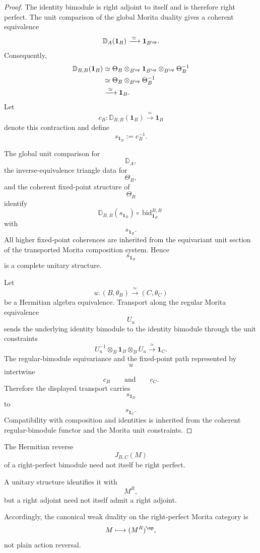 \begin{proof}
The identity bimodule is right adjoint to itself and is therefore right
perfect. The unit comparison of the global Morita duality gives a
coherent equivalence
\[
    \mathbb D_A(\mathbf 1_B)
    \xrightarrow{\;\simeq\;}
    \mathbf 1_{B^{\op}}.
\]
Consequently,
\[
\begin{aligned}
    \mathbb D_{B,B}(\mathbf 1_B)
    &\simeq
    \Theta_B
    \otimes_{B^{\op}}
    \mathbf 1_{B^{\op}}
    \otimes_{B^{\op}}
    \Theta_B^{-1}
    \\
    &\simeq
    \Theta_B
    \otimes_{B^{\op}}
    \Theta_B^{-1}
    \\
    &\xrightarrow{\;\simeq\;}
    \mathbf 1_B.
\end{aligned}
\]
Let
\[
    c_B
    \colon
    \mathbb D_{B,B}(\mathbf 1_B)
    \xrightarrow{\;\simeq\;}
    \mathbf 1_B
\]
denote this contraction and define
\[
    s_{\mathbf 1_B}
    :=
    c_B^{-1}.
\]

The global unit comparison for
\[
    \mathbb D_A,
\]
the inverse-equivalence triangle data for
\[
    \Theta_B,
\]
and the coherent fixed-point structure of
\[
    \Theta_B
\]
identify
\[
    \mathbb D_{B,B}(s_{\mathbf 1_B})
    \circ
    \operatorname{bid}^{B,B}_{\mathbf 1_B}
\]
with
\[
    s_{\mathbf 1_B}.
\]
All higher fixed-point coherences are inherited from the equivariant unit
section of the transported Morita composition system. Hence
\[
    s_{\mathbf 1_B}
\]
is a complete unitary structure.

Let
\[
    u
    \colon
    (B,\theta_B)
    \xrightarrow{\;\simeq\;}
    (C,\theta_C)
\]
be a Hermitian algebra equivalence. Transport along the regular Morita
equivalence
\[
    U_u
\]
sends the underlying identity bimodule to the identity bimodule through
the unit constraints
\[
    U_u^{-1}
    \otimes_B
    \mathbf 1_B
    \otimes_B
    U_u
    \xrightarrow{\;\simeq\;}
    \mathbf 1_C.
\]
The regular-bimodule equivariance and the fixed-point path represented by
\[
    u
\]
intertwine
\[
    c_B
    \qquad\text{and}\qquad
    c_C.
\]
Therefore the displayed transport carries
\[
    s_{\mathbf 1_B}
\]
to
\[
    s_{\mathbf 1_C}.
\]
Compatibility with composition and identities is inherited from the
coherent regular-bimodule functor and the Morita unit constraints.
\end{proof}

\begin{remark}
\label{rem:plain-reversal-not-right-perfect}
The Hermitian reverse
\[
    J_{B,C}(M)
\]
of a right-perfect bimodule need not itself be right perfect.

A unitary structure identifies it with
\[
    M^R,
\]
but a right adjoint need not itself admit a right adjoint.

Accordingly, the canonical weak duality on the right-perfect Morita
category is
\[
    M
    \longmapsto
    (M^R)^{\op},
\]
not plain action reversal.
\end{remark}

